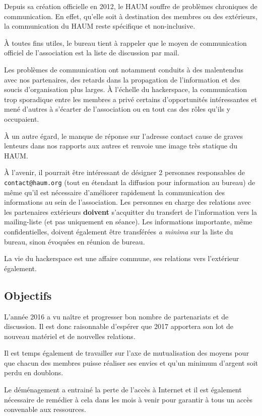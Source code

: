 \documentclass[a4paper, 11pt]{article}
\begin{document}
Depuis sa création officielle en 2012, le HAUM souffre de problèmes chroniques de communication. En effet, qu'elle soit à destination des membres ou des extérieurs, la communication du HAUM reste spécifique et non-inclusive.

À toutes fins utiles, le bureau tient à rappeler que le moyen de communication officiel de l'association est la liste de discussion par mail.

Les problèmes de communication ont notamment conduits à des malentendus avec nos partenaires, des retards dans la propagation de l'information et des soucis d'organisation plus larges. À l'échelle du hackerspace, la communication trop sporadique entre les membres a privé certains d'opportunités intéressantes et mené d'autres à s'écarter de l'association ou en tout cas des rôles qu'ils y occupaient.

À un autre égard, le manque de réponse sur l'adresse contact cause de graves lenteurs dans nos rapports aux autres et renvoie une image très statique du HAUM.

À l'avenir, il pourrait être intéressant de désigner 2 personnes responsables de \texttt{contact@haum.org} (tout en étendant la diffusion pour information au bureau) de même qu'il est nécessaire d'améliorer rapidement la communication des informations au sein de l'association. Les personnes en charge des relations avec les partenaires extérieurs \textbf{doivent} s'acquitter du transfert de l'information vers la mailing-liste (et pas uniquement en séance). Les informations importante, même confidentielles, doivent également être transférées \textit{a minima} sur la liste du bureau, sinon évoquées en réunion de bureau.

La vie du hackerspace est une affaire commune, ses relations vers l'extérieur également.

\subsection{Objectifs}

L'année 2016 a vu naître et progresser bon nombre de partenariats et de discussion. Il est donc raisonnable d'espérer que 2017 apportera son lot de nouveau matériel et de nouvelles relations.

Il est temps également de travailler sur l'axe de mutualisation des moyens pour que chacun des membres puisse réaliser ses envies et qu'un minimum d'argent soit perdu en doublons.

Le déménagement a entrainé la perte de l'accès à Internet et il est également nécessaire de remédier à cela dans les mois à venir pour garantir à tous un accès convenable aux ressources.
\end{document}
